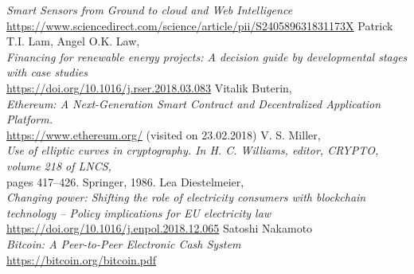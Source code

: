 \documentclass[11pt]{article}
\begin{document}
\begin{thebibliography}{25}
	\textit{Smart Sensors from Ground to cloud and Web Intelligence}\\
	\hyperref[https://www.sciencedirect.com/science/article/pii/S240589631831173X]{https://www.sciencedirect.com/science/article/pii/S240589631831173X}
	Patrick T.I. Lam, Angel O.K. Law, \\
	\textit{Financing for renewable energy projects: A decision guide by developmental stages with case studies}\\
	\hyperref[https://doi.org/10.1016/j.rser.2018.03.083]{https://doi.org/10.1016/j.rser.2018.03.083}
	Vitalik Buterin, \\
	\textit{Ethereum: A Next-Generation Smart
Contract and Decentralized Application Platform.}\\
	\hyperref[https://www.ethereum.org/]{https://www.ethereum.org/}  (visited on 23.02.2018)
	V. S. Miller, \\
	\textit{Use of elliptic curves in cryptography. In H. C. Williams, editor, CRYPTO, volume 218 of
LNCS,}\\
	  pages 417–426. Springer, 1986.
	Lea Diestelmeier, \\
	\textit{Changing power: Shifting the role of electricity consumers with blockchain technology – Policy implications for EU electricity law} \\
	\hyperref[https://doi.org/10.1016/j.enpol.2018.12.065]{https://doi.org/10.1016/j.enpol.2018.12.065}
	Satoshi Nakamoto \\
	\textit{Bitcoin: A Peer-to-Peer Electronic Cash System} \\
	\hyperref[https://bitcoin.org/bitcoin.pdf]{https://bitcoin.org/bitcoin.pdf}


\end{thebibliography}
\end{document}
